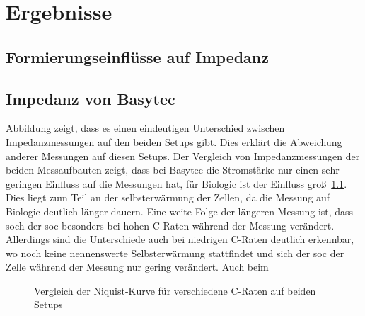 \chapter{Ergebnisse}\label{ch:ergebnisse}%
\section{Formierungseinflüsse auf Impedanz}\label{sec:form}

\section{Impedanz von Basytec}\label{sec:impedanz-von-basytec}
Abbildung zeigt, dass es einen eindeutigen Unterschied zwischen Impedanzmessungen auf den beiden Setups gibt.
Dies erklärt die Abweichung anderer Messungen auf diesen Setups.
Der Vergleich von Impedanzmessungen der beiden Messaufbauten zeigt, dass bei Basytec die Stromstärke nur einen sehr
geringen Einfluss auf die Messungen hat, für Biologic ist der Einfluss groß~\ref{fig:vgl_bio_basy_c_rate}.
Dies liegt zum Teil an der selbsterwärmung der Zellen, da die Messung auf Biologic deutlich länger dauern.
Eine weite Folge der längeren Messung ist, dass soch der \gls{soc} besonders bei hohen C-Raten während der Messung
verändert.
Allerdings sind die Unterschiede auch bei niedrigen C-Raten deutlich erkennbar, wo noch keine nennenswerte
Selbsterwärmung stattfindet und sich der \gls{soc} der Zelle während der Messung nur gering verändert.
Auch beim


\begin{figure} [H]
    \centering
    \fontsize{10pt}{10pt}
    \centering
    \newcommand\svgwidth{1\linewidth}
    
    \caption{Vergleich der Niquist-Kurve für verschiedene C-Raten auf beiden Setups}
    \label{fig:vgl_bio_basy_c_rate}
\end{figure}
